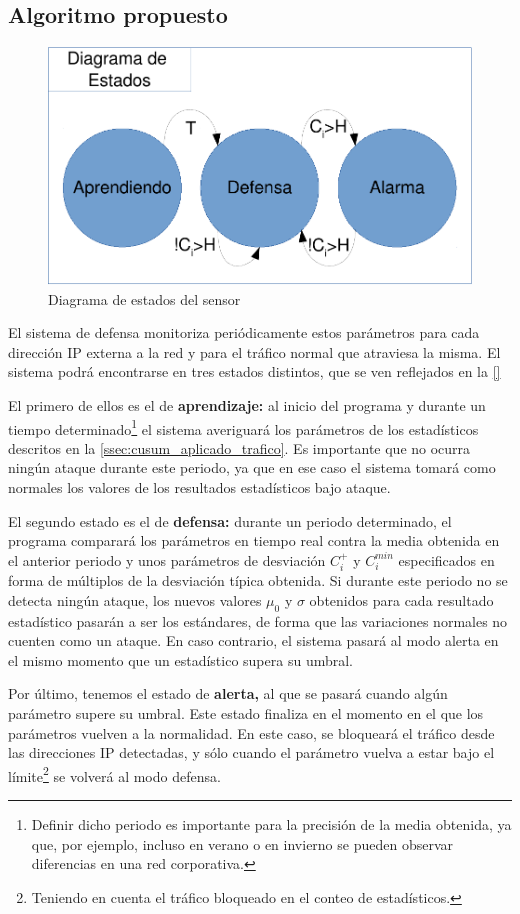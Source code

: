 \subsection{Algoritmo propuesto}
\begin{figure}[htbp]
\centering
\includegraphics[width=0.8\columnwidth]{CapituloCusum/Figuras/DiagramaEstados-crop}
\caption{Diagrama de estados del sensor}
\label{fig:diagrama_estados} 
\end{figure}

El sistema de defensa \redborderddos monitoriza periódicamente estos parámetros
para cada dirección IP externa a la red y para el tráfico normal que atraviesa
la misma. El sistema podrá encontrarse en tres estados distintos, que se ven reflejados
en la \autoref{}

El primero de ellos es el de \textbf{aprendizaje:} al
inicio del programa y durante un tiempo determinado\footnote{Definir dicho
periodo es importante para la precisión de la media obtenida, ya que, por ejemplo, incluso en
verano o en invierno se pueden observar diferencias en una red corporativa.}
el sistema averiguará los parámetros de los estadísticos descritos en la 
\autoref{ssec:cusum_aplicado_trafico}. Es importante que no ocurra ningún
ataque durante este periodo, ya que en ese caso el sistema tomará como normales
los valores de los resultados estadísticos bajo ataque. %

El segundo estado es el de \textbf{defensa:} durante un periodo determinado, el programa comparará
los parámetros en tiempo real contra la media obtenida en el anterior periodo y
unos parámetros de desviación $C_i^+$ y $C_i^{min}$ especificados en forma de múltiplos
de la desviación típica obtenida. Si durante este periodo no se detecta ningún ataque, los nuevos
valores $\mu_0$ y $\sigma$ obtenidos para cada resultado estadístico pasarán a ser los estándares, de
forma que las variaciones normales no cuenten como un ataque. En caso contrario, el sistema pasará al modo alerta en el mismo
momento que un estadístico supera su umbral. %

Por último, tenemos el estado de \textbf{alerta,} al que se pasará cuando algún parámetro supere su umbral. Este estado finaliza en el
momento en el que los parámetros vuelven a la normalidad. En este caso, se bloqueará el tráfico desde
las direcciones IP detectadas, y sólo cuando el parámetro vuelva a estar bajo el límite\footnote{Teniendo
en cuenta el tráfico bloqueado en el conteo de estadísticos.} se volverá al modo defensa.

\endinput
